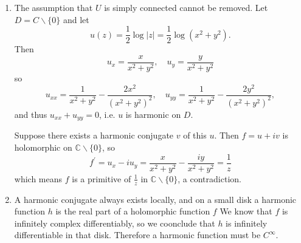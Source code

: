\begin{remark}
\begin{enumerate}
  \item{
    The assumption that $U$ is simply connected cannot be removed.
    Let $D = C \backslash \{ 0 \}$ and let
    $$
    u(z) = \frac{1}{2} \log |z| = \frac{1}{2} \log (x^2 + y^2).
    $$
    Then
    $$
    u_x = \frac{x}{x^2 + y^2}, \quad
    u_y = \frac{y}{x^2 + y^2}
    $$
    so
    $$
    u_{xx} = \frac{1}{x^2 + y^2} - \frac{2 x^2}{(x^2 + y^2)^2}, \quad
    u_{yy} = \frac{1}{x^2 + y^2} - \frac{2 y^2}{(x^2 + y^2)^2},
    $$
    and thus $u_{xx} + u_{yy} = 0$, i.e. $u$ is harmonic on $D$.

    Suppose there exists a harmonic conjugate $v$ of this $u$.
    Then $f = u + iv$ is holomorphic on $\mathbb{C} \backslash \{ 0 \}$,
    so
    $$
      f^\prime
    = u_x - i u_y
    = \frac{x}{x^2 + y^2} - \frac{iy}{x^2 + y^2}
    = \frac{1}{z}
    $$
    which means $f$ is a primitive of $\frac{1}{z}$ in
    $\mathbb{C} \backslash \{ 0 \}$, a contradiction.
  }
  \item{
    A harmonic conjugate always exists locally, and on a small disk
    a harmonic function $h$ is the real part of a holomorphic function $f$
    We know that $f$ is infinitely complex differentiably, so we coonclude that
    $h$ is infinitely differentiable in that disk. Therefore a harmonic
    function must be $C^\infty$.
  }
\end{enumerate}
\end{remark}
